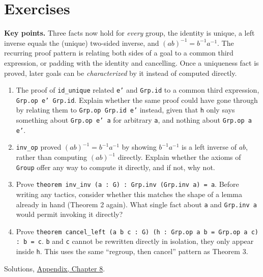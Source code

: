 \section{Exercises}\label{sec:08-group-theorems:05-exercises:1}

\textbf{Key points.} Three facts now hold for \emph{every} group, the identity is unique, a left inverse equals the (unique) two-sided inverse, and \((ab)^{-1}=b^{-1}a^{-1}\). The recurring proof pattern is relating both sides of a goal to a common third expression, or padding with the identity and cancelling. Once a uniqueness fact is proved, later goals can be \emph{characterized} by it instead of computed directly.

\begin{enumerate}
\def\labelenumi{\arabic{enumi}.}
\tightlist
\item
  The proof of \texttt{id\_\allowbreak{}unique} related \texttt{e'} and \texttt{Grp.id} to a common third expression, \texttt{Grp.op e' Grp.id}. Explain whether the same proof could have gone through by relating them to \texttt{Grp.op Grp.id e'} instead, given that \texttt{h} only says something about \texttt{Grp.op e' a} for arbitrary \texttt{a}, and nothing about \texttt{Grp.op a e'}.
\item
  \texttt{inv\_\allowbreak{}op} proved \((ab)^{-1}=b^{-1}a^{-1}\) by showing \(b^{-1}a^{-1}\) is a left inverse of \(ab\), rather than computing \((ab)^{-1}\) directly. Explain whether the axioms of \texttt{Group} offer any way to compute it directly, and if not, why not.
\item
  Prove \texttt{theorem inv\_\allowbreak{}inv (a : G) : Grp.inv (Grp.inv a) = a}. Before writing any tactics, consider whether this matches the shape of a lemma already in hand (Theorem 2 again). What single fact about \texttt{a} and \texttt{Grp.inv a} would permit invoking it directly?
\item
  Prove \texttt{theorem cancel\_\allowbreak{}left (a b c : G) (h : Grp.op a b = Grp.op a c) : b = c}. \texttt{b} and \texttt{c} cannot be rewritten directly in isolation, they only appear inside \texttt{h}. This uses the same ``regroup, then cancel'' pattern as Theorem 3.
\end{enumerate}

Solutions, \hyperref[sec:15-appendix-solutions:08-chapter-8:1]{Appendix, Chapter 8}.


